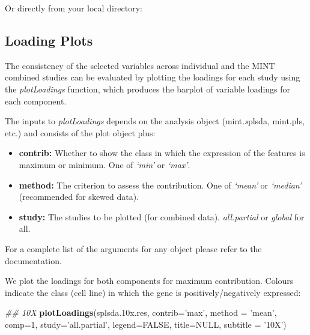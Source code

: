 \documentclass[]{book}
\newenvironment{Shaded}{\begin{snugshade}}{\end{snugshade}}
\newcommand{\CommentTok}[1]{\textcolor[rgb]{0.56,0.35,0.01}{\textit{#1}}}
\newcommand{\DataTypeTok}[1]{\textcolor[rgb]{0.13,0.29,0.53}{#1}}
\newcommand{\DecValTok}[1]{\textcolor[rgb]{0.00,0.00,0.81}{#1}}
\newcommand{\FloatTok}[1]{\textcolor[rgb]{0.00,0.00,0.81}{#1}}
\newcommand{\KeywordTok}[1]{\textcolor[rgb]{0.13,0.29,0.53}{\textbf{#1}}}
\newcommand{\NormalTok}[1]{#1}
\newcommand{\OtherTok}[1]{\textcolor[rgb]{0.56,0.35,0.01}{#1}}
\newcommand{\StringTok}[1]{\textcolor[rgb]{0.31,0.60,0.02}{#1}}
\providecommand{\tightlist}{%
  \setlength{\itemsep}{0pt}\setlength{\parskip}{0pt}}
\theoremstyle{definition}
\theoremstyle{definition}
\theoremstyle{definition}
\theoremstyle{remark}
\begin{document}
Or directly from your local directory:

\hypertarget{loading-plots}{%
\subsection{Loading Plots}\label{loading-plots}}

The consistency of the selected variables across individual and the MINT
combined studies can be evaluated by plotting the loadings for each
study using the \emph{plotLoadings} function, which produces the barplot
of variable loadings for each component.

The inputs to \emph{plotLoadings} depends on the analysis object
(mint.\emph{s}plsda, mint.pls, etc.) and consists of the plot object
plus:

\begin{itemize}
\tightlist
\item
  \textbf{contrib:} Whether to show the class in which the expression of
  the features is maximum or minimum. One of \emph{`min'} or
  \emph{`max'}.
\item
  \textbf{method:} The criterion to assess the contribution. One of
  \emph{`mean'} or \emph{`median'} (recommended for skewed data).
\item
  \textbf{study:} The studies to be plotted (for combined data).
  \emph{all.partial} or \emph{global} for all.
\end{itemize}

For a complete list of the arguments for any object please refer to the
documentation.

We plot the loadings for both components for maximum contribution.
Colours indicate the class (cell line) in which the gene is
positively/negatively expressed:

\begin{Shaded}
\begin{Highlighting}[]
\CommentTok{## 10X}
\KeywordTok{plotLoadings}\NormalTok{(splsda}\FloatTok{.10}\NormalTok{x.res, }\DataTypeTok{contrib=}\StringTok{'max'}\NormalTok{, }\DataTypeTok{method =} \StringTok{'mean'}\NormalTok{, }\DataTypeTok{comp=}\DecValTok{1}\NormalTok{, }
             \DataTypeTok{study=}\StringTok{'all.partial'}\NormalTok{, }\DataTypeTok{legend=}\OtherTok{FALSE}\NormalTok{, }\DataTypeTok{title=}\OtherTok{NULL}\NormalTok{, }
             \DataTypeTok{subtitle =} \StringTok{'10X'}\NormalTok{)}
\end{Highlighting}
\end{Shaded}
\end{document}
